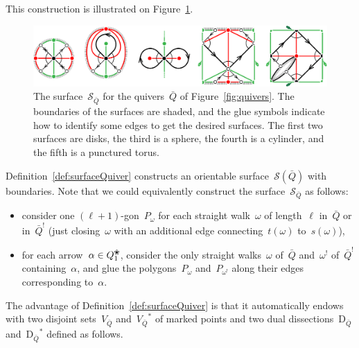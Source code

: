 \documentclass{amsart}
\theoremstyle{definition}
\newcommand{\fref}[1]{Figure~\ref{#1}} %
\newcommand{\blossom}{^\text{\ding{96}}} %
\newcommand{\surface}{\mathcal{S}} %
\newcommand{\dual}{^*} %
\newcommand{\dissection}{\mathrm{D}} %
\newcommand{\koszul}{^!} %
\begin{document}
This construction is illustrated on \fref{fig:examplesSurfaces}.
%
\begin{figure}[t]
	\capstart
	\centerline{\includegraphics[scale=.7]{examplesSurfaces}}
	\caption{The surface~$\surface_{\bar Q}$ for the quivers~$\bar Q$ of \fref{fig:quivers}. The boundaries of the surfaces are shaded, and the glue symbols indicate how to identify some edges to get the desired surfaces. The first two surfaces are disks, the third is a sphere, the fourth is a cylinder, and the fifth is a punctured torus.}
	\label{fig:examplesSurfaces}
\end{figure}

%
Definition~\ref{def:surfaceQuiver} constructs an orientable surface~$\surface(\bar Q)$ with boundaries.
Note that we could equivalently construct the surface~$\surface_{\bar Q}$ as follows:
\begin{itemize}
\item consider one $(\ell+1)$-gon~$P_\omega$ for each straight walk~$\omega$ of length~$\ell$ in~$\bar Q$ or in~$\bar Q\koszul$ (just closing~$\omega$ with an additional edge connecting~$t(\omega)$ to~$s(\omega)$),
\item for each arrow~$\alpha \in Q_1\blossom$, consider the only straight walks~$\omega$ of~$\bar Q$ and~$\omega\koszul$ of~$\bar Q\koszul$ containing~$\alpha$, and glue the polygons~$P_\omega$ and~$P_{\omega\koszul}$ along their edges corresponding to~$\alpha$.
\end{itemize}
The advantage of Definition~\ref{def:surfaceQuiver} is that it automatically endows with two disjoint sets~$V_{\bar Q}$ and~${V_{\bar Q}}\dual$ of marked points and two dual dissections~$\dissection_{\bar Q}$ and~${\dissection_{\bar Q}}\dual$ defined as follows.
\end{document}

